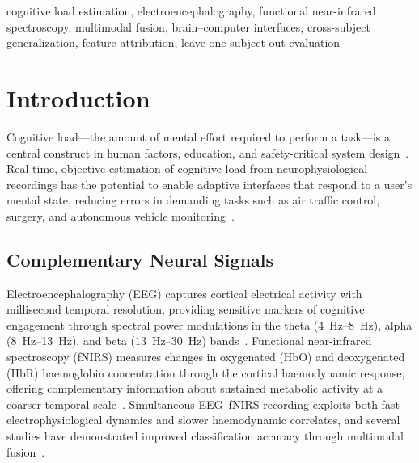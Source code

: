 \documentclass[conference]{IEEEtran}
\begin{document}
\begin{IEEEkeywords}
cognitive load estimation, electroencephalography, functional near-infrared spectroscopy, multimodal fusion, brain--computer interfaces, cross-subject generalization, feature attribution, leave-one-subject-out evaluation
\end{IEEEkeywords}

\section{Introduction}

Cognitive load---the amount of mental effort required to perform a task---is a central construct in human factors, education, and safety-critical system design~\cite{sweller1988cognitive}. Real-time, objective estimation of cognitive load from neurophysiological recordings has the potential to enable adaptive interfaces that respond to a user's mental state, reducing errors in demanding tasks such as air traffic control, surgery, and autonomous vehicle monitoring~\cite{parasuraman2008neuroergonomics}.

\subsection{Complementary Neural Signals}
Electroencephalography (EEG) captures cortical electrical activity with millisecond temporal resolution, providing sensitive markers of cognitive engagement through spectral power modulations in the theta (\SIrange{4}{8}{\hertz}), alpha (\SIrange{8}{13}{\hertz}), and beta (\SIrange{13}{30}{\hertz}) bands~\cite{gevins1998monitoring, antonenko2010using}. Functional near-infrared spectroscopy (fNIRS) measures changes in oxygenated (HbO) and deoxygenated (HbR) haemoglobin concentration through the cortical haemodynamic response, offering complementary information about sustained metabolic activity at a coarser temporal scale~\cite{ayaz2012optical, herff2014mental}. Simultaneous EEG--fNIRS recording exploits both fast electrophysiological dynamics and slower haemodynamic correlates, and several studies have demonstrated improved classification accuracy through multimodal fusion~\cite{shin2018simultaneous, fazli2012enhanced, aghajani2017measuring}.
\end{document}

